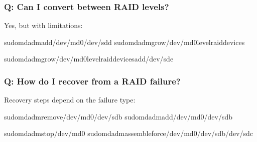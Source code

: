 \documentclass[letterpaper,10pt,english]{sphinxmanual}
\begin{document}
\subsubsection{Q: Can I convert between RAID levels?}
\label{\detokenize{raid-systems:q-can-i-convert-between-raid-levels}}
\sphinxAtStartPar
{} Yes, but with limitations:

\begin{sphinxVerbatim}[commandchars=\\\{\}]
sudomdadm\PYGZhy{}\PYGZhy{}add/dev/md0/dev/sdd
sudomdadm\PYGZhy{}\PYGZhy{}grow/dev/md0\PYGZhy{}\PYGZhy{}level\PYGZhy{}\PYGZhy{}raid\PYGZhy{}devices

sudomdadm\PYGZhy{}\PYGZhy{}grow/dev/md0\PYGZhy{}\PYGZhy{}level\PYGZhy{}\PYGZhy{}raid\PYGZhy{}devices\PYGZhy{}\PYGZhy{}add/dev/sde

\end{sphinxVerbatim}


\subsubsection{Q: How do I recover from a RAID failure?}
\label{\detokenize{raid-systems:q-how-do-i-recover-from-a-raid-failure}}
\sphinxAtStartPar
{} Recovery steps depend on the failure type:

\begin{sphinxVerbatim}[commandchars=\\\{\}]
sudomdadm\PYGZhy{}\PYGZhy{}remove/dev/md0/dev/sdb
sudomdadm\PYGZhy{}\PYGZhy{}add/dev/md0/dev/sdb

sudomdadm\PYGZhy{}\PYGZhy{}stop/dev/md0
sudomdadm\PYGZhy{}\PYGZhy{}assemble\PYGZhy{}\PYGZhy{}force/dev/md0/dev/sdb/dev/sdc

\end{sphinxVerbatim}
\end{document}
